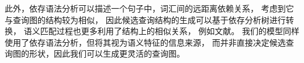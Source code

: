 
此外，依存语法分析可以描述一个句子中，词汇间的远距离依赖关系，
考虑到它与查询图的结构较为相似，
因此候选查询结构的生成可以基于依存分析树进行转换，
语义匹配过程也更多利用了结构上的相似关系，
例如文献\parencite{reddy2016transforming,hu2018answering}。
我们的模型同样使用了依存语法分析，但将其视为语义特征的信息来源，
而并非直接决定候选查询图的形状，因此我们可以生成更灵活的查询图。

%




